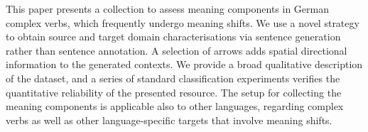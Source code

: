 This paper presents a collection to assess meaning components in German complex verbs, which frequently undergo meaning shifts. We use a novel strategy to obtain source and target domain characterisations via sentence generation rather than sentence annotation. A selection of arrows adds spatial directional information to the generated contexts. We provide a broad qualitative description of the dataset, and a series of standard classification experiments verifies the quantitative reliability of the presented resource. The setup for collecting the meaning components is applicable also to other languages, regarding complex verbs as well as other language-specific targets that involve meaning shifts.
